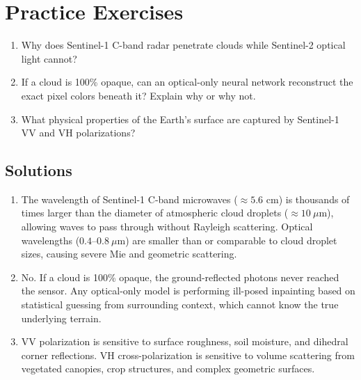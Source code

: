 \section{Practice Exercises}
\begin{enumerate}
    \item Why does Sentinel-1 C-band radar penetrate clouds while Sentinel-2 optical light cannot?
    \item If a cloud is 100\% opaque, can an optical-only neural network reconstruct the exact pixel colors beneath it? Explain why or why not.
    \item What physical properties of the Earth's surface are captured by Sentinel-1 VV and VH polarizations?
\end{enumerate}

\subsection*{Solutions}
\begin{enumerate}
    \item The wavelength of Sentinel-1 C-band microwaves ($\approx 5.6\text{ cm}$) is thousands of times larger than the diameter of atmospheric cloud droplets ($\approx 10\ \mu\text{m}$), allowing waves to pass through without Rayleigh scattering. Optical wavelengths ($0.4\text{--}0.8\ \mu\text{m}$) are smaller than or comparable to cloud droplet sizes, causing severe Mie and geometric scattering.
    \item No. If a cloud is 100\% opaque, the ground-reflected photons never reached the sensor. Any optical-only model is performing ill-posed inpainting based on statistical guessing from surrounding context, which cannot know the true underlying terrain.
    \item VV polarization is sensitive to surface roughness, soil moisture, and dihedral corner reflections. VH cross-polarization is sensitive to volume scattering from vegetated canopies, crop structures, and complex geometric surfaces.
\end{enumerate}
